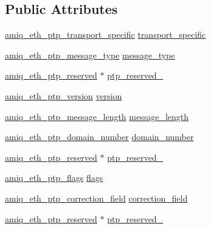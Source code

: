 \subsection*{Public Attributes}
\begin{DoxyCompactItemize}
\item 
\hyperlink{amiq__eth__types_8cpp_aab37995d6465c50fd72265140440db08}{amiq\_\-eth\_\-ptp\_\-transport\_\-specific} \hyperlink{classamiq__eth__packet__ptp__header_a3ed673b4781a4400bf3fa0c65a0cb6d7}{transport\_\-specific}
\item 
\hyperlink{amiq__eth__types_8cpp_a619ff98cdb5a79f8d8e57f83999fc4a9}{amiq\_\-eth\_\-ptp\_\-message\_\-type} \hyperlink{classamiq__eth__packet__ptp__header_a77d4684093a9017850a8abddbba8dde4}{message\_\-type}
\item 
\hyperlink{amiq__eth__types_8cpp_ad10b57e0e913c9526272e60a5d0b7402}{amiq\_\-eth\_\-ptp\_\-reserved} $\ast$ \hyperlink{classamiq__eth__packet__ptp__header_a761cd2dccbba318c56f98137da6de429}{ptp\_\-reserved\_}
\item 
\hyperlink{amiq__eth__types_8cpp_a9f7c461ab52ea5b854eee3bb53db892a}{amiq\_\-eth\_\-ptp\_\-version} \hyperlink{classamiq__eth__packet__ptp__header_a6d5c2946688a068e73a6878edf967644}{version}
\item 
\hyperlink{amiq__eth__types_8cpp_a9fea32b60281db26dda428ba033f0d93}{amiq\_\-eth\_\-ptp\_\-message\_\-length} \hyperlink{classamiq__eth__packet__ptp__header_a815ae17dbbf6f031982993da0e714be5}{message\_\-length}
\item 
\hyperlink{amiq__eth__types_8cpp_a139096cb6b92040d2036153fa1964e4f}{amiq\_\-eth\_\-ptp\_\-domain\_\-number} \hyperlink{classamiq__eth__packet__ptp__header_acd74f33993f8d252846b11407105598a}{domain\_\-number}
\item 
\hyperlink{amiq__eth__types_8cpp_ad10b57e0e913c9526272e60a5d0b7402}{amiq\_\-eth\_\-ptp\_\-reserved} $\ast$ \hyperlink{classamiq__eth__packet__ptp__header_a990527bd407cce0280f9003dad5dcd78}{ptp\_\-reserved\_}
\item 
\hyperlink{amiq__eth__types_8cpp_a6ecd97cfb8d9ee3a2cfabc9e74fc7608}{amiq\_\-eth\_\-ptp\_\-flags} \hyperlink{classamiq__eth__packet__ptp__header_a167d8513bbd0a8c00983dcc29998ebf5}{flags}
\item 
\hyperlink{amiq__eth__types_8cpp_a8e7986e048c50f116f0991095a86fc0f}{amiq\_\-eth\_\-ptp\_\-correction\_\-field} \hyperlink{classamiq__eth__packet__ptp__header_ac985b496e7edef0abbb81b23f5a2d585}{correction\_\-field}
\item 
\hyperlink{amiq__eth__types_8cpp_ad10b57e0e913c9526272e60a5d0b7402}{amiq\_\-eth\_\-ptp\_\-reserved} $\ast$ \hyperlink{classamiq__eth__packet__ptp__header_a1aa9a91e12f4b734de610092f8abd6cb}{ptp\_\-reserved\_}

\end{DoxyCompactItemize}
